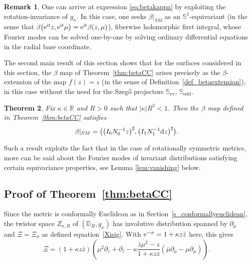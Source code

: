\documentclass[pdftex]{sigma}
\numberwithin{equation}{section}
\newtheorem{Theorem}{Theorem}[section]
\theoremstyle{definition}
\newtheorem{Remark}[Theorem]{Remark}
\newcommand{\ev}{\mathrm{ev}}
\newcommand{\1}{{\bf 1}}
\newcommand \Dm { \mathbb{D}}
\newcommand \Rm { \mathbb{R}}
\newcommand \Sm { \mathbb{S}}
\newcommand \zbar { \bar{z}}
\newcommand \mubar {{\bar{\mu}}}
\begin{document}
\begin{Remark}
	One can arrive at expression \eqref{eq:betakappa} by exploiting the rotation-invariance of $g_\kappa$. In this case, one seeks $\beta|_{SM}$ as an $\Sm^1$-equivariant (in the sense that $\beta\bigl({\rm e}^{{\rm i}t}z,{\rm e}^{{\rm i}t}\mu\bigr) = {\rm e}^{{\rm i}t} \beta(z,\mu)$), fiberwise holomorphic first integral, whose Fourier modes can be solved one-by-one by solving ordinary differential equations in the radial base coordinate.
\end{Remark}

The second main result of this section shows that for the surfaces considered in this section, the $\beta$ map of Theorem~\ref{thm:betaCC} arises precisely as the $\beta$-extension of the map $f(z) = z$ (in the sense of Definition~\ref{def_betaextension}), in this case without the need for the Szeg\H{o} projectors $\mathbb S_{\ev}$, $\mathbb S_{\mathrm{odd}}$.

\begin{Theorem}\label{thm:preimages}
	Fix $\kappa\in \Rm$ and $R>0$ such that $|\kappa| R^2<1$. Then the $\beta$ map defined in Theorem~{\rm\ref{thm:betaCC}} satisfies
	\begin{align*}
		\beta|_{SM} =\bigl(\bigl(I_0 N_0^{-1} z\bigr)^\sharp, \bigl(I_1 N_1^{-1} {\rm d}z\bigr)^\sharp\bigr).
	\end{align*}
\end{Theorem}

Such a result exploits the fact that in the case of rotationally symmetric metrics, more can be said about the Fourier modes of invariant distributions satisfying certain equivariance properties, see Lemma \ref{lem:vanishing} below.

\subsection[Proof of Theorem 4.1]{Proof of Theorem~\ref{thm:betaCC}} \label{ssec:proofbetaCC}

Since the metric is conformally Euclidean as in Section~\ref{s_conformallyeuclidean}, the twistor space $Z_{\kappa,R}$ of $(\Dm_R, g_\kappa)$ has involutive distribution spanned by $\partial_{\mubar}$ and $\Xi = \Xi_\sigma$ as defined equation~\eqref{Xisig}. With ${\rm e}^{-\sigma} = 1+\kappa z \zbar$ here, this gives
\[ %
	\Xi = (1+\kappa z\zbar) \left( \mu^2 \partial_z + \partial_{\zbar} - \kappa \frac{\zbar \mu^2-z}{1+\kappa z\zbar} (\mubar \partial_{\mubar} - \mu\partial_\mu) \right).	
\]
\end{document}
